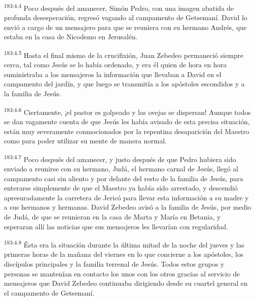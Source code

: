 \par 
\textsuperscript{183:4.4} Poco después del amanecer, Simón Pedro, con una imagen abatida de profunda desesperación, regresó vagando al campamento de Getsemaní. David lo envió a cargo de un mensajero para que se reuniera con su hermano Andrés, que estaba en la casa de Nicodemo en Jerusalén.

\par 
\textsuperscript{183:4.5} Hasta el final mismo de la crucifixión, Juan Zebedeo permaneció siempre cerca, tal como Jesús se lo había ordenado, y era él quien de hora en hora suministraba a los mensajeros la información que llevaban a David en el campamento del jardín, y que luego se transmitía a los apóstoles escondidos y a la familia de Jesús.

\par 
\textsuperscript{183:4.6} Ciertamente, ¡el pastor es golpeado y las ovejas se dispersan! Aunque todos se dan vagamente cuenta de que Jesús les había avisado de esta precisa situación, están muy severamente conmocionados por la repentina desaparición del Maestro como para poder utilizar su mente de manera normal.

\par 
\textsuperscript{183:4.7} Poco después del amanecer, y justo después de que Pedro hubiera sido enviado a reunirse con su hermano, Judá, el hermano carnal de Jesús, llegó al campamento casi sin aliento y por delante del resto de la familia de Jesús, para enterarse simplemente de que el Maestro ya había sido arrestado, y descendió apresuradamente la carretera de Jericó para llevar esta información a su madre y a sus hermanos y hermanas. David Zebedeo avisó a la familia de Jesús, por medio de Judá, de que se reunieran en la casa de Marta y María en Betania, y esperaran allí las noticias que sus mensajeros les llevarían con regularidad.

\par 
\textsuperscript{183:4.8} Ésta era la situación durante la última mitad de la noche del jueves y las primeras horas de la mañana del viernes en lo que concierne a los apóstoles, los discípulos principales y la familia terrenal de Jesús. Todos estos grupos y personas se mantenían en contacto los unos con los otros gracias al servicio de mensajeros que David Zebedeo continuaba dirigiendo desde su cuartel general en el campamento de Getsemaní.

